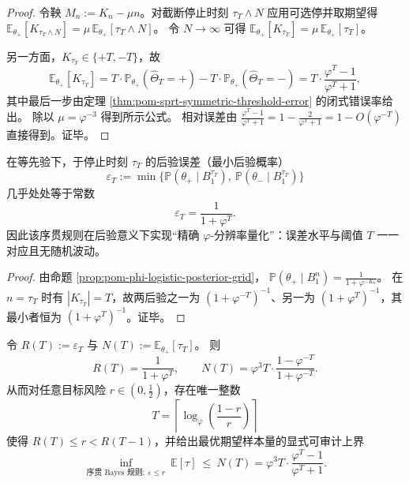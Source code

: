\begin{proof}
令鞅 \(M_n:=K_n-\mu n\)。对截断停止时刻 \(\tau_T\wedge N\) 应用可选停并取期望得
\(
\mathbb{E}_{\theta_+}[K_{\tau_T\wedge N}]=\mu\,\mathbb{E}_{\theta_+}[\tau_T\wedge N]
\)。
令 \(N\to\infty\) 可得 \(\mathbb{E}_{\theta_+}[K_{\tau_T}]=\mu\,\mathbb{E}_{\theta_+}[\tau_T]\)。
\par
另一方面，\(K_{\tau_T}\in\{+T,-T\}\)，故
\[
\mathbb{E}_{\theta_+}[K_{\tau_T}]
=T\cdot\mathbb{P}_{\theta_+}(\widehat\Theta_T=+)-T\cdot\mathbb{P}_{\theta_+}(\widehat\Theta_T=-)
=T\cdot\frac{\varphi^{T}-1}{\varphi^{T}+1},
\]
其中最后一步由定理 \ref{thm:pom-sprt-symmetric-threshold-error} 的闭式错误率给出。
除以 \(\mu=\varphi^{-3}\) 得到所示公式。
相对误差由 \(\frac{\varphi^T-1}{\varphi^T+1}=1-\frac{2}{\varphi^T+1}=1-O(\varphi^{-T})\) 直接得到。证毕。
\end{proof}

\begin{corollary}\label{cor:pom-sprt-stopping-posterior-constant}
在等先验下，于停止时刻 \(\tau_T\) 的后验误差（最小后验概率）
\[
\varepsilon_T:=\min\{\mathbb{P}(\theta_+\mid B_1^{\tau_T}),\ \mathbb{P}(\theta_-\mid B_1^{\tau_T})\}
\]
几乎处处等于常数
\[
\boxed{\;\varepsilon_T=\frac{1}{1+\varphi^{T}}.\;}
\]
因此该序贯规则在后验意义下实现“精确 \(\varphi\)-分辨率量化”：误差水平与阈值 \(T\) 一一对应且无随机波动。
\end{corollary}

\begin{proof}
由命题 \ref{prop:pom-phi-logistic-posterior-grid}，
\(
\mathbb{P}(\theta_+\mid B_1^n)=\frac{1}{1+\varphi^{-K_n}}
\)。
在 \(n=\tau_T\) 时有 \(|K_{\tau_T}|=T\)，故两后验之一为 \((1+\varphi^{-T})^{-1}\)、另一为 \((1+\varphi^{T})^{-1}\)，其最小者恒为 \((1+\varphi^{T})^{-1}\)。证毕。
\end{proof}

\begin{proposition}[风险--复杂度前沿的参数化闭式与可逆性]\label{prop:pom-risk-complexity-frontier}
令 \(R(T):=\varepsilon_T\) 与 \(N(T):=\mathbb{E}_{\theta_+}[\tau_T]\)。
则
\[
\boxed{\;
R(T)=\frac{1}{1+\varphi^{T}},\qquad
N(T)=\varphi^{3}T\cdot\frac{1-\varphi^{-T}}{1+\varphi^{-T}}.\;}
\]
从而对任意目标风险 \(r\in(0,\tfrac12)\)，存在唯一整数
\[
T=\left\lceil\log_\varphi\!\left(\frac{1-r}{r}\right)\right\rceil
\]
使得 \(R(T)\le r<R(T-1)\)，并给出最优期望样本量的显式可审计上界
\[
\inf_{\text{序贯 Bayes 规则}:\ \varepsilon\le r}\ \mathbb{E}[\tau]
\ \le\ N(T)
=\varphi^{3}T\cdot\frac{\varphi^{T}-1}{\varphi^{T}+1}.
\]
\end{proposition}

